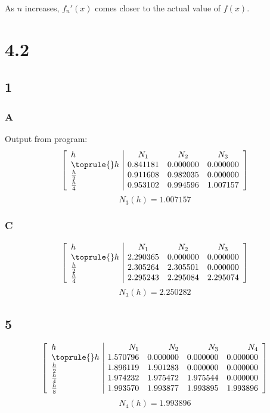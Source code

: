 \documentclass{oisinclass}
\begin{document}
As \(n\) increases, \(f_n'(x)\) comes closer to the actual value of \(f(x)\).

\section*{4.2}
\subsection*{1}
\subsubsection*{A}

Output from program:
\[
	\left[
		\begin{array}{l|ccc}
			h           & N_1      & N_2      & N_3      \\
			\toprule{}
			h           & 0.841181 & 0.000000 & 0.000000 \\
			\frac{h}{2} & 0.911608 & 0.982035 & 0.000000 \\
			\frac{h}{4} & 0.953102 & 0.994596 & 1.007157
		\end{array}
		\right]
\]
\[N_3(h) = 1.007157\]
\newpage
\subsubsection*{C}
\[\left[
		\begin{array}{l|ccc}
			h           & N_1      & N_2      & N_3      \\
			\toprule{}
			h           & 2.290365 & 0.000000 & 0.000000 \\
			\frac{h}{2} & 2.305264 & 2.305501 & 0.000000 \\
			\frac{h}{4} & 2.295243 & 2.295084 & 2.295074
		\end{array}
		\right]\]
\[N_3(h) = 2.250282\]

\subsection*{5}
\[
	\left[
		\begin{array}{l|rrrr}
			h           & N_1      & N_2      & N_3      & N_4      \\
			\toprule{}
			h           & 1.570796 & 0.000000 & 0.000000 & 0.000000 \\
			\frac{h}{2} & 1.896119 & 1.901283 & 0.000000 & 0.000000 \\
			\frac{h}{4} & 1.974232 & 1.975472 & 1.975544 & 0.000000 \\
			\frac{h}{8} & 1.993570 & 1.993877 & 1.993895 & 1.993896
		\end{array}
		\right]
\]
\[
	N_4(h) = 1.993896
\]
\end{document}
